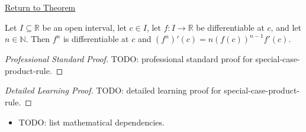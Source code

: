 \newpage
{}
\label{prf:special-case-product-rule}

\begin{remark*}[Return]
\hyperref[cor:power-rule-special-case]{Return to Theorem}
\end{remark*}

\begin{corollary*}
Let $I \subseteq \mathbb{R}$ be an open interval, let $c \in I$, let $f : I \to \mathbb{R}$ be differentiable at $c$, and let $n \in \mathbb{N}$. Then $f^n$ is differentiable at $c$ and $(f^n)'(c) = n(f(c))^{n-1}f'(c)$.
\end{corollary*}

\begin{proof}[Professional Standard Proof]
\LRAProofBodyStart
TODO: professional standard proof for special-case-product-rule.
\end{proof}

\begin{proof}[Detailed Learning Proof]
\LRAProofBodyStart
TODO: detailed learning proof for special-case-product-rule.
\end{proof}

\begin{remark*}
\end{remark*}

\begin{dependencies}
\begin{itemize}
  \item TODO: list mathematical dependencies.
\end{itemize}
\end{dependencies}

\clearpage
